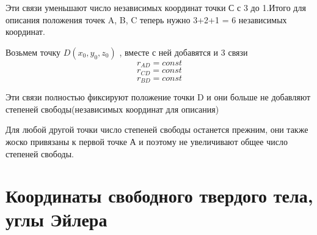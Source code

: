 \documentclass[12pt,a4paper]{report}
\begin{document}
Эти связи уменьшают число независимых координат точки С с 3 до 1.Итого для описания положения точек A, B, C теперь нужно 3+2+1 = 6 независимых координат.

Возьмем точку $D(x_0,y_0,z_0)$ , вместе с ней добавятся и 3 связи
\[ r_{AD} = const\]
\[ r_{CD} = const\]
\[ r_{BD} = const\]

Эти связи полностью фиксируют положение точки D и они больше не добавляют степеней свободы(независимых координат для описания)

Для любой другой точки число степеней свободы останется прежним, они также жоско привязаны к первой точке А и поэтому не увеличивают общее число степеней свободы.

\section{Координаты свободного твердого тела, углы Эйлера}
\end{document}
